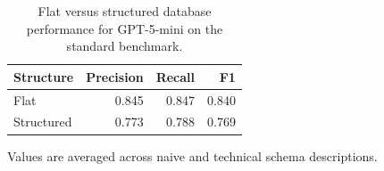 \begin{table}[htbp]
\centering
\small
\caption{Flat versus structured database performance for GPT-5-mini on the standard benchmark.}
\label{tab:flat-structured-gpt5mini}
\begin{tabular}{lrrr}
\toprule
Structure & Precision & Recall & F1 \\
\midrule
Flat & 0.845 & 0.847 & 0.840 \\
Structured & 0.773 & 0.788 & 0.769 \\
\bottomrule
\end{tabular}
\par\footnotesize{Values are averaged across naive and technical schema descriptions.}
\end{table}
